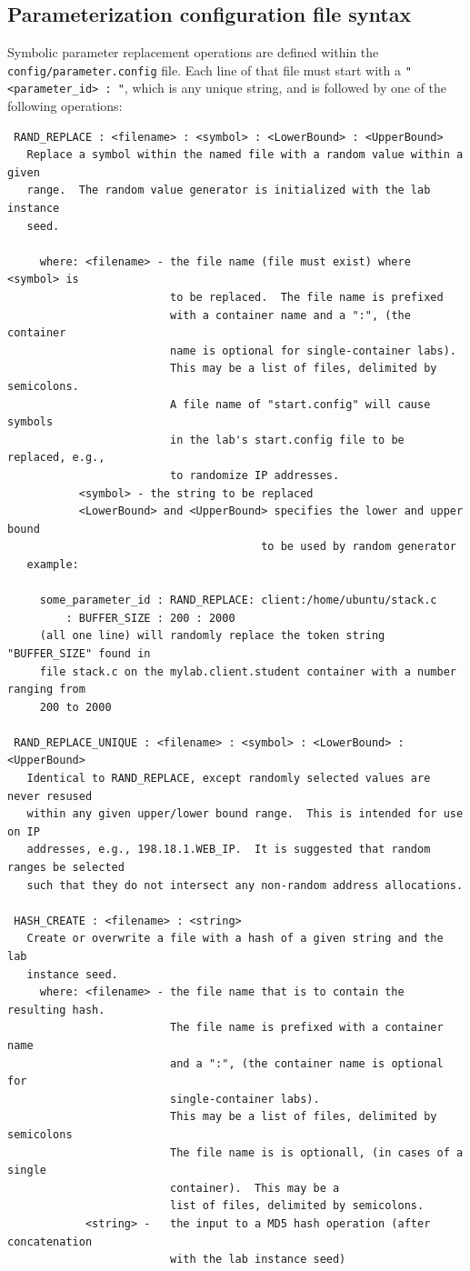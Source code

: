 \documentclass[12pt]{article}
\begin{document}
\subsection{Parameterization configuration file syntax}
Symbolic parameter replacement operations are defined within the {\tt config/parameter.config} file.
Each line of that file must start with a \verb!"<parameter_id> : "!, which is any unique string, and
is followed by one of the following operations:

\begin{verbatim}
 RAND_REPLACE : <filename> : <symbol> : <LowerBound> : <UpperBound>
   Replace a symbol within the named file with a random value within a given
   range.  The random value generator is initialized with the lab instance
   seed.

     where: <filename> - the file name (file must exist) where <symbol> is 
                         to be replaced.  The file name is prefixed 
                         with a container name and a ":", (the container 
                         name is optional for single-container labs).  
                         This may be a list of files, delimited by semicolons. 
                         A file name of "start.config" will cause symbols
                         in the lab's start.config file to be replaced, e.g.,
                         to randomize IP addresses.
           <symbol> - the string to be replaced
           <LowerBound> and <UpperBound> specifies the lower and upper bound
                                       to be used by random generator
   example:

     some_parameter_id : RAND_REPLACE: client:/home/ubuntu/stack.c 
         : BUFFER_SIZE : 200 : 2000
     (all one line) will randomly replace the token string "BUFFER_SIZE" found in
     file stack.c on the mylab.client.student container with a number ranging from 
     200 to 2000

 RAND_REPLACE_UNIQUE : <filename> : <symbol> : <LowerBound> : <UpperBound>
   Identical to RAND_REPLACE, except randomly selected values are never resused
   within any given upper/lower bound range.  This is intended for use on IP
   addresses, e.g., 198.18.1.WEB_IP.  It is suggested that random ranges be selected
   such that they do not intersect any non-random address allocations.
 
 HASH_CREATE : <filename> : <string>
   Create or overwrite a file with a hash of a given string and the lab 
   instance seed.
     where: <filename> - the file name that is to contain the resulting hash.
                         The file name is prefixed with a container name 
                         and a ":", (the container name is optional for 
                         single-container labs).  
                         This may be a list of files, delimited by semicolons 
                         The file name is is optionall, (in cases of a single
                         container).  This may be a 
                         list of files, delimited by semicolons.
            <string> -   the input to a MD5 hash operation (after concatenation 
                         with the lab instance seed)
                       

\end{verbatim}
\end{document}
